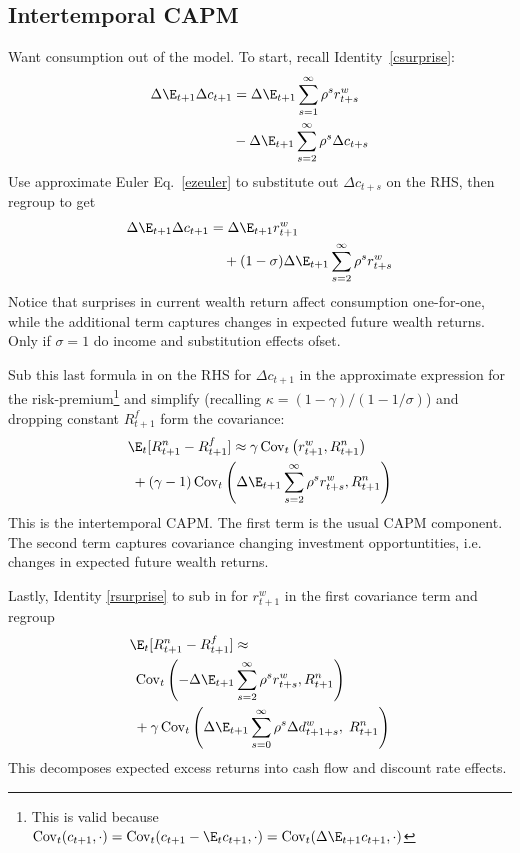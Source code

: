 \documentclass[12pt]{article}
\theoremstyle{plain}
\theoremstyle{definition}
\theoremstyle{remark}
\newcommand{\Cov}{\operatorname{Cov}}
\begin{document}
\begin{multicols*}{2}
\subsection{Intertemporal CAPM}

Want consumption out of the model. To start, recall
Identity~\ref{csurprise}:
\begin{align*}
  \Delta \E_{t+1}\Delta c_{t+1}
  &=
  \Delta \E_{t+1}\sum_{s=1}^\infty \rho^s r^w_{t+s}
  \notag
  \\
  &- \Delta \E_{t+1}\sum_{s=2}^\infty \rho^s \Delta c_{t+s}
\end{align*}
Use approximate Euler Eq.~\ref{ezeuler} to substitute out
$\Delta c_{t+s}$ on the RHS, then regroup to get
\begin{align*}
  \Delta \E_{t+1}\Delta c_{t+1}
  &=
  \Delta \E_{t+1}r_{t+1}^w
  \\
  &\quad
  + (1-\sigma)\Delta\E_{t+1}\sum_{s=2}^\infty \rho^s r^w_{t+s}
  \notag
\end{align*}
Notice that surprises in current wealth return affect consumption
one-for-one, while the additional term captures changes in expected
future wealth returns.
Only if $\sigma=1$ do income and substitution effects ofset.

Sub this last formula in on the RHS for $\Delta c_{t+1}$ in the
approximate expression for the risk-premium\footnote{%
  This is valid because
  $\Cov_t(c_{t+1},\cdot)=\Cov_t(c_{t+1}-\E_tc_{t+1},\cdot)
  =\Cov_t(\Delta
  \E_{t+1}c_{t+1},\cdot)$
}
and simplify (recalling $\kappa=(1-\gamma)/(1-1/\sigma)$) and dropping
constant $R^f_{t+1}$ form the covariance:
\begin{align*}
  &\E_t[R_{t+1}^n-R_{t+1}^f]
  \approx
  \gamma
  \Cov_t\left(
  r^w_{t+1},
  R_{t+1}^n
  \right)
  \\
  &\;
  +
  (\gamma-1)
  \Cov_t\left(
  \Delta \E_{t+1}\sum_{s=2}^\infty \rho^s r^w_{t+s},
  R_{t+1}^n
  \right)
\end{align*}
This is the intertemporal CAPM. The first term is the usual CAPM
component. The second term captures covariance changing investment
opportuntities, i.e. changes in expected future wealth returns.

Lastly, Identity \ref{rsurprise} to sub in for $r^w_{t+1}$ in the first
covariance term and regroup
\begin{align*}
  &\E_t[R_{t+1}^n-R_{t+1}^f]
  \approx
  \\
  &\;
  \Cov_t\left(
  -\Delta\E_{t+1}\sum_{s=2}^\infty \rho^s r^w_{t+s},
  R_{t+1}^n
  \right)
  \\
  &\;
  +\gamma
  \Cov_t\left(
  \Delta \E_{t+1} \sum_{s=0}^\infty \rho^{s}\Delta d_{t+1+s}^w
  ,\;
  R_{t+1}^n
  \right)
\end{align*}
This decomposes expected excess returns into cash flow and discount rate
effects.


\end{multicols*}
\end{document}
